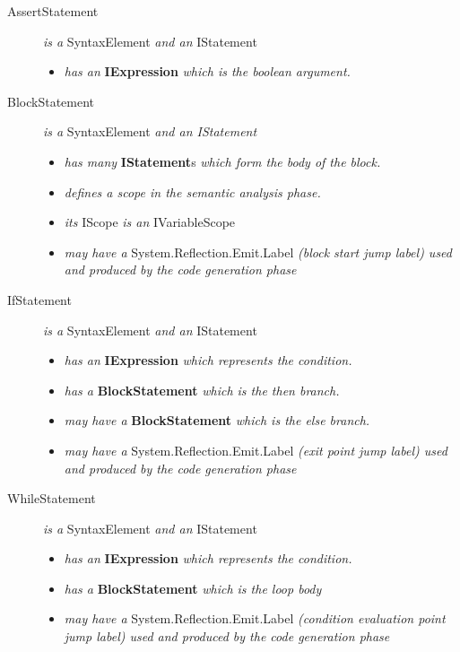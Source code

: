 \documentclass[a4paper,11pt]{article}
\begin{document}
\begin{description}
\begin{itemize}
      \end{itemize}
    \item[AssertStatement] \emph{is a} SyntaxElement \emph{and an} IStatement
      \begin{itemize}
        \item \emph{has an} \textbf{IExpression} \emph{which is the boolean argument.}
      \end{itemize}
    \item[BlockStatement] \emph{is a} SyntaxElement \emph{and an IStatement}
      \begin{itemize}
        \item \emph{has many} \textbf{IStatement}s \emph{which form the body of the block.}
        \item \emph{defines a scope in the semantic analysis phase.}
        \item \emph{its} IScope \emph{is an} IVariableScope
        \item \emph{may have a} System.Reflection.Emit.Label \emph{(block start jump label) used and produced by the code generation phase}
      \end{itemize}
    \item[IfStatement] \emph{is a} SyntaxElement \emph{and an} IStatement
      \begin{itemize}
        \item \emph{has an} \textbf{IExpression} \emph{which represents the condition.}
        \item \emph{has a} \textbf{BlockStatement} \emph{which is the then branch.}
        \item \emph{may have a} \textbf{BlockStatement} \emph{which is the else branch.}
        \item \emph{may have a} System.Reflection.Emit.Label \emph{(exit point jump label) used and produced by the code generation phase}
      \end{itemize}
    \item[WhileStatement] \emph{is a} SyntaxElement \emph{and an} IStatement
      \begin{itemize}
        \item \emph{has an} \textbf{IExpression} \emph{which represents the condition.}
        \item \emph{has a} \textbf{BlockStatement} \emph{which is the loop body}
        \item \emph{may have a} System.Reflection.Emit.Label \emph{(condition evaluation point jump label) used and produced by the code generation phase}

\end{itemize}
\end{description}
\end{document}
